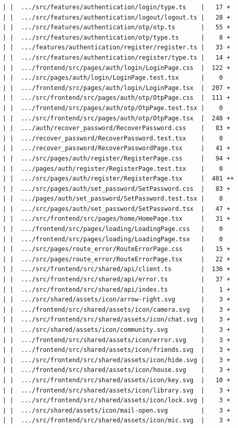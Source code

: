\documentclass[12pt]{article}
\begin{document}
\begin{lstlisting}[numbers=none,breaklines=true]
| |  .../src/features/authentication/login/type.ts    |   17 +
| |  .../src/features/authentication/logout/logout.ts |   28 +
| |  .../src/features/authentication/otp/otp.ts       |   55 +
| |  .../src/features/authentication/otp/type.ts      |    8 +
| |  .../features/authentication/register/register.ts |   33 +
| |  .../src/features/authentication/register/type.ts |   14 +
| |  .../frontend/src/pages/auth/login/LoginPage.css  |  122 +
| |  .../src/pages/auth/login/LoginPage.test.tsx      |    0
| |  .../frontend/src/pages/auth/login/LoginPage.tsx  |  207 +
| |  .../src/frontend/src/pages/auth/otp/OtpPage.css  |  111 +
| |  .../frontend/src/pages/auth/otp/OtpPage.test.tsx |    0
| |  .../src/frontend/src/pages/auth/otp/OtpPage.tsx  |  248 +
| |  .../auth/recover_password/RecoverPassword.css    |   83 +
| |  .../recover_password/RecoverPassword.test.tsx    |    0
| |  .../recover_password/RecoverPasswordPage.tsx     |   41 +
| |  .../src/pages/auth/register/RegisterPage.css     |   94 +
| |  .../pages/auth/register/RegisterPage.test.tsx    |    0
| |  .../src/pages/auth/register/RegisterPage.tsx     |  401 ++
| |  .../src/pages/auth/set_password/SetPassword.css  |   83 +
| |  .../pages/auth/set_password/SetPassword.test.tsx |    0
| |  .../src/pages/auth/set_password/SetPassword.tsx  |   47 +
| |  .../src/frontend/src/pages/home/HomePage.tsx     |   31 +
| |  .../frontend/src/pages/loading/LoadingPage.css   |    0
| |  .../frontend/src/pages/loading/LoadingPage.tsx   |    0
| |  .../src/pages/route_error/RouteErrorPage.css     |   15 +
| |  .../src/pages/route_error/RouteErrorPage.tsx     |   22 +
| |  .../src/frontend/src/shared/api/client.ts        |  136 +
| |  .../src/frontend/src/shared/api/error.ts         |   37 +
| |  .../src/frontend/src/shared/api/index.ts         |    1 +
| |  .../src/shared/assets/icon/arrow-right.svg       |    3 +
| |  .../frontend/src/shared/assets/icon/camera.svg   |    3 +
| |  .../src/frontend/src/shared/assets/icon/chat.svg |    3 +
| |  .../src/shared/assets/icon/community.svg         |    3 +
| |  .../frontend/src/shared/assets/icon/error.svg    |    3 +
| |  .../frontend/src/shared/assets/icon/friends.svg  |    3 +
| |  .../src/frontend/src/shared/assets/icon/hide.svg |    3 +
| |  .../frontend/src/shared/assets/icon/house.svg    |    3 +
| |  .../src/frontend/src/shared/assets/icon/key.svg  |   10 +
| |  .../frontend/src/shared/assets/icon/library.svg  |    3 +
| |  .../src/frontend/src/shared/assets/icon/lock.svg |    3 +
| |  .../src/shared/assets/icon/mail-open.svg         |    3 +
| |  .../src/frontend/src/shared/assets/icon/mic.svg  |    3 +

\end{lstlisting}
\end{document}
